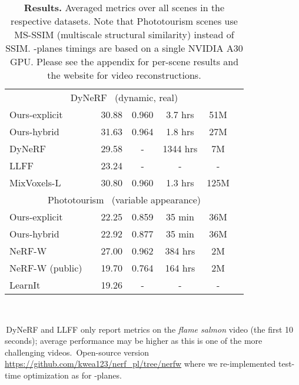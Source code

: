\documentclass[10pt,twocolumn,letterpaper]{article}
\newcommand{\modelname}{-planes}
\newcommand{\Modelname}{-planes}
\begin{document}
\begin{table}
{\begin{threeparttable}
\begin{tabular}{@{}llccccc@{}}
    \multicolumn{7}{c}{DyNeRF~\cite{dynerf} (dynamic, real)}               \\
    \cmidrule(r){1-1} \cmidrule(l){3-7}
    Ours-explicit              && 30.88 & 0.960 & 3.7 hrs & 51M            \\
    Ours-hybrid                && 31.63 & 0.964 & 1.8 hrs & 27M            \\
    DyNeRF~\cite{dynerf}       && 29.58 & - & 1344 hrs  & 7M      \\
    LLFF~\cite{llff}           && 23.24 & - & - & -               \\
    MixVoxels-L\cite{mixvoxels}&& 30.80 & 0.960 & 1.3 hrs & 125M\\
    \cmidrule{1-7}

    \multicolumn{7}{c}{Phototourism~\cite{phototourism} (variable appearance)} \\
    \cmidrule(r){1-1} \cmidrule(l){3-7}  
    Ours-explicit  && 22.25 & 0.859 & 35 min & 36M                         \\
    Ours-hybrid  && 22.92 & 0.877 & 35 min & 36M                           \\
    NeRF-W~\cite{martinbrualla2020nerfw} && 27.00 & 0.962 & 384 hrs & 2M           \\
    NeRF-W (public)\tnote{2}       && 19.70 & 0.764 & 164 hrs & 2M       \\
    LearnIt \cite{learnit}     && 19.26 & - & - & -                        \\
    \bottomrule
   \end{tabular}
  \end{threeparttable}
 }
 \\
 {
  \footnotesize \,DyNeRF and LLFF only report metrics on the \emph{flame salmon} video (the first 10 seconds); average performance may be higher as this is one of the more challenging videos.
  \,Open-source version \url{https://github.com/kwea123/nerf_pl/tree/nerfw} where we re-implemented test-time optimization as for \modelname{}.
  \par
 }
 \caption{\textbf{Results.} 
    Averaged metrics over all scenes in the respective datasets. Note that Phototourism scenes use MS-SSIM (multiscale structural similarity) instead of SSIM. 
\Modelname{} timings are based on a single NVIDIA A30 GPU. 
   Please see the appendix for per-scene results and the website for video reconstructions. 
 }\label{tab:results}
 \vspace{-2em}
\end{table}
\end{document}
